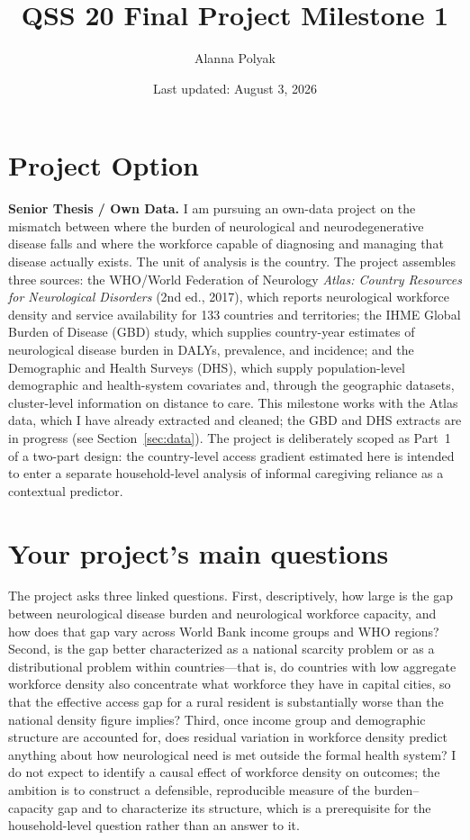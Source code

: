 \documentclass[11pt]{article}
\title{QSS 20 Final Project Milestone 1}
\author{Alanna Polyak}
\date{Last updated: August 3, 2026}
\begin{document}
\maketitle

\section{Project Option}

\textbf{Senior Thesis / Own Data.} I am pursuing an own-data project on the
mismatch between where the burden of neurological and neurodegenerative disease
falls and where the workforce capable of diagnosing and managing that disease
actually exists. The unit of analysis is the country. The project assembles
three sources: the WHO/World Federation of Neurology \emph{Atlas: Country
Resources for Neurological Disorders} (2nd ed., 2017), which reports
neurological workforce density and service availability for 133 countries and
territories; the IHME Global Burden of Disease (GBD) study, which supplies
country-year estimates of neurological disease burden in DALYs, prevalence, and
incidence; and the Demographic and Health Surveys (DHS), which supply
population-level demographic and health-system covariates and, through the
geographic datasets, cluster-level information on distance to care. This
milestone works with the Atlas data, which I have already extracted and cleaned;
the GBD and DHS extracts are in progress (see Section~\ref{sec:data}). The
project is deliberately scoped as Part~1 of a two-part design: the country-level
access gradient estimated here is intended to enter a separate household-level
analysis of informal caregiving reliance as a contextual predictor.

\section{Your project's main questions}

The project asks three linked questions. First, descriptively, how large is the
gap between neurological disease burden and neurological workforce capacity, and
how does that gap vary across World Bank income groups and WHO regions? Second,
is the gap better characterized as a national scarcity problem or as a
distributional problem within countries---that is, do countries with low
aggregate workforce density also concentrate what workforce they have in capital
cities, so that the effective access gap for a rural resident is substantially
worse than the national density figure implies? Third, once income group and
demographic structure are accounted for, does residual variation in workforce
density predict anything about how neurological need is met outside the formal
health system? I do not expect to identify a causal effect of workforce density
on outcomes; the ambition is to construct a defensible, reproducible measure of
the burden--capacity gap and to characterize its structure, which is a
prerequisite for the household-level question rather than an answer to it.
\end{document}
